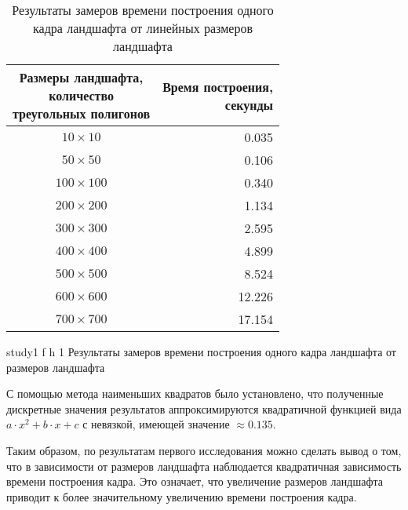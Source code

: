 \begin{table}[ht]
	\begin{center}
		\begin{threeparttable}
			\caption{Результаты замеров времени построения одного кадра ландшафта от линейных размеров ландшафта}
			\label{tbl:RenderLandscapeTimeBySize}
			\begin{tabular}{|c|r|}
				\hline
				\bfseries \makecell{Размеры ландшафта, \\ количество \\ треугольных  полигонов} & \bfseries \makecell{Время построения, \\ секунды}  \\
				\hline
				$10\times10$ &  0.035 \\
				\hline
				$50\times50$ &  0.106 \\
				\hline
				$100\times100$ &  0.340 \\
				\hline
				$200\times200$ &  1.134 \\
				\hline
				$300\times300$ &  2.595 \\
				\hline
				$400\times400$ &  4.899 \\
				\hline
				$500\times500$ &  8.524 \\
				\hline
				$600\times600$ &  12.226 \\
				\hline
				$700\times700$ &  17.154 \\
				\hline
			\end{tabular}
		\end{threeparttable}
	\end{center}
\end{table}

\clearpage

{study1} %
{f} %
{h} %
{1\textwidth} %
{Результаты замеров времени построения одного кадра ландшафта от размеров ландшафта} %
	

С помощью метода наименьших квадратов было установлено, что полученные дискретные значения результатов аппроксимируются квадратичной функцией вида $a \cdot x^2 + b \cdot x + c$ с невязкой, имеющей значение $\approx 0.135$.

Таким образом, по результатам первого исследования можно сделать вывод о том, что в зависимости от размеров ландшафта наблюдается квадратичная зависимость времени построения кадра. 
Это означает, что увеличение размеров ландшафта приводит к более значительному увеличению времени построения кадра.


